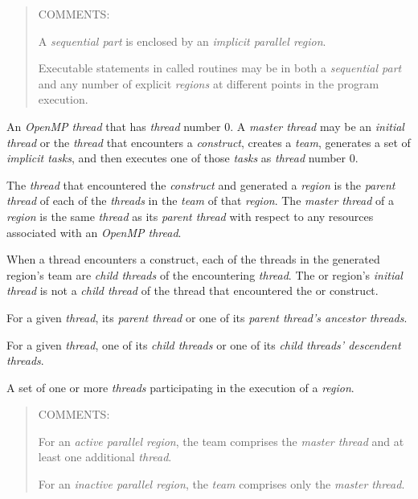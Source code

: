 \begin{quote}
COMMENTS:

A \emph{sequential part} is enclosed by an \emph{implicit parallel region}.

Executable statements in called routines may be in both a \emph{sequential
part} and any number of explicit  \emph{regions} at different 
points in the program execution.
\end{quote}
\glossarydefend

\glossarydefstart
An \emph{OpenMP thread} that has  \emph{thread} number 0. A \emph{master
thread} may be an \emph{initial thread} or the \emph{thread} that encounters a
 \emph{construct}, creates a \emph{team}, generates a set of
\emph{implicit tasks}, and then executes one of those \emph{tasks} as
\emph{thread} number 0.
\glossarydefend

\glossarydefstart
The \emph{thread} that encountered the  \emph{construct} 
and generated a  \emph{region} is the \emph{parent thread} 
of each of the \emph{threads} in the \emph{team} of that
 \emph{region}. The \emph{master thread}
of a  \emph{region} is the same \emph{thread}
as its \emph{parent thread} with respect to any resources associated with 
an \emph{OpenMP thread}.
\glossarydefend

\glossarydefstart
When a thread encounters a  construct, each of the threads 
in the generated  region's team are \emph{child threads} of 
the encountering \emph{thread}. The  or  region's 
\emph{initial thread} is not a \emph{child thread} of the thread
that encountered the  or  construct.
\glossarydefend

\glossarydefstart
For a given \emph{thread}, its \emph{parent thread} or one of its 
\emph{parent thread's ancestor threads}.
\glossarydefend

\glossarydefstart
For a given \emph{thread}, one of its \emph{child threads} or one of
its \emph{child threads' descendent threads}.
\glossarydefend

\glossarydefstart
A set of one or more \emph{threads} participating in the execution 
of a 
\emph{region}.

\begin{quote}
COMMENTS:

For an \emph{active parallel region}, the team comprises the 
\emph{master thread} and at least one additional \emph{thread}.

For an \emph{inactive parallel region}, the \emph{team} comprises 
only the \emph{master thread}.
\end{quote}
\glossarydefend

